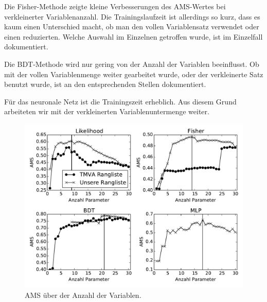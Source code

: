 Die Fisher-Methode zeigte kleine Verbesserungen des AMS-Wertes bei verkleinerter Variablenanzahl. Die Trainingslaufzeit ist allerdings so kurz, dass es kaum einen Unterschied macht, ob man den vollen Variablensatz verwendet oder einen reduzierten. Welche Auswahl im Einzelnen getroffen wurde, ist im Einzelfall dokumentiert.

Die BDT-Methode wird nur gering von der Anzahl der Variablen beeinflusst. Ob mit der vollen Variablenmenge weiter gearbeitet wurde, oder der verkleinerte Satz benutzt wurde, ist an den entsprechenden Stellen dokumentiert.

Für das neuronale Netz ist die Trainingszeit erheblich. Aus diesem Grund arbeiteten wir mit der verkleinerten Variablenuntermenge weiter.  


\begin{figure}[htp]
\begin{center}
  \includegraphics[width=\linewidth]{sections/subset_of_parameters/parameter_count_ranking_by_method.pdf}
  \caption[AMS über der Anzahl der Parameter]{AMS über der Anzahl der Variablen.}
  \label{fig:ams_over_parameter_count}
\end{center}
\end{figure}

